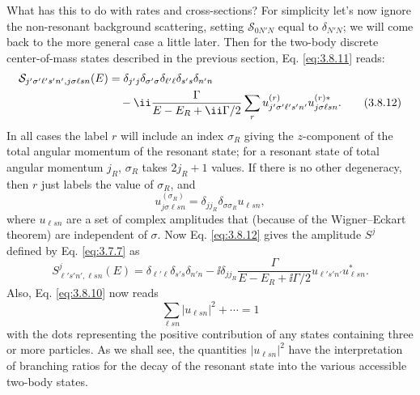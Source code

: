 What has this to do with rates and cross-sections? For simplicity let's now
ignore the non-resonant background scattering, setting
$\mathcal S_{0N'N}$ equal to $\delta_{N'N}$; we will come back to the more
general case a little later. Then for the two-body discrete center-of-mass
states described in the previous section, Eq. \eqref{eq:3.8.11} reads:
\begin{align}
  \mathcal S_{j'\sigma'\ell's'n',j\sigma\ell sn}(E)
  &=\delta_{j'j}\delta_{\sigma'\sigma}\delta_{\ell'\ell}
    \delta_{s's}\delta_{n'n} \notag\\
  &\quad-\ii\frac{\Gamma}{E-E_R+\ii\Gamma/2}
    \sum_r u_{j'\sigma'\ell's'n'}^{(r)}
           u_{j\sigma\ell sn}^{(r)*}.
  \tag{3.8.12}\label{eq:3.8.12}
\end{align}
In all cases the label $r$ will include an index $\sigma_R$ giving the
$z$-component of the total angular momentum of the resonant state; for a
resonant state of total angular momentum $j_R$, $\sigma_R$ takes $2j_R+1$
values. If there is no other degeneracy, then $r$ just labels the value of
$\sigma_R$, and
\begin{equation}
  u_{j\sigma\ell sn}^{(\sigma_R)}
  =\delta_{jj_R}\delta_{\sigma\sigma_R}u_{\ell sn},
  \tag{3.8.13}\label{eq:3.8.13}
\end{equation}
where $u_{\ell sn}$ are a set of complex amplitudes that (because of the
Wigner--Eckart theorem) are independent of $\sigma$. Now Eq. \eqref{eq:3.8.12} gives
the amplitude $S^j$ defined by Eq. \eqref{eq:3.7.7} as
\begin{equation}
  S^j_{\ell's'n',\ell sn}(E)
  =\delta_{\ell'\ell}\delta_{s's}\delta_{n'n}
  -\ii\delta_{jj_R}\frac{\Gamma}{E-E_R+\ii\Gamma/2}
   u_{\ell's'n'}u_{\ell sn}^*.
  \tag{3.8.14}\label{eq:3.8.14}
\end{equation}
Also, Eq. \eqref{eq:3.8.10} now reads
\begin{equation}
  \sum_{\ell sn}|u_{\ell sn}|^2+\cdots=1
  \tag{3.8.15}\label{eq:3.8.15}
\end{equation}
with the dots representing the positive contribution of any states containing
three or more particles. As we shall see, the quantities $|u_{\ell sn}|^2$
have the interpretation of branching ratios for the decay of the resonant
state into the various accessible two-body states.

